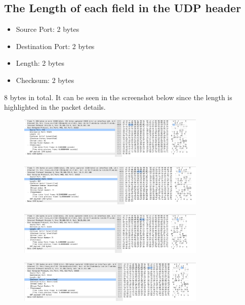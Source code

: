 \documentclass{article}
\begin{document}
\begin{CJK*}{UTF8}{gbsn}
\section{The Length of each field in the UDP header}
\begin{itemize}
    \item Source Port: 2 bytes
    \item Destination Port: 2 bytes
    \item Length: 2 bytes
    \item Checksum: 2 bytes
\end{itemize}
8 bytes in total.
It can be seen in the screenshot below since the length is highlighted in the packet details.
\begin{figure}[H]
    \centering
    \includegraphics[width=0.8\textwidth]{Q2 - PrintOut1.png}
\end{figure}
\begin{figure}[H]
    \centering
    \includegraphics[width=0.8\textwidth]{Q2 - PrintOut2.png}
\end{figure}
\begin{figure}[H]
    \centering
    \includegraphics[width=0.8\textwidth]{Q2 - PrintOut3.png}
\end{figure}
\begin{figure}[H]
    \centering
    \includegraphics[width=0.8\textwidth]{Q2 - PrintOut4.png}
\end{figure}
\end{CJK*}
\end{document}
